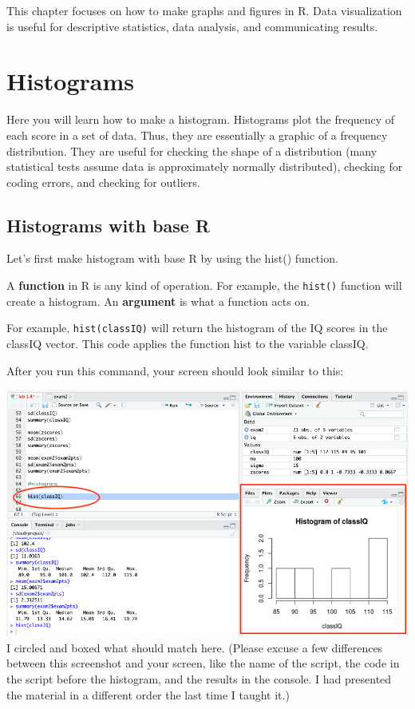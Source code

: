 \documentclass[
]{book}
\begin{document}
This chapter focuses on how to make graphs and figures in R. Data visualization is useful for descriptive statistics, data analysis, and communicating results.

\hypertarget{histograms}{%
\section{Histograms}\label{histograms}}

Here you will learn how to make a histogram. Histograms plot the frequency of each score in a set of data. Thus, they are essentially a graphic of a frequency distribution. They are useful for checking the shape of a distribution (many statistical tests assume data is approximately normally distributed), checking for coding errors, and checking for outliers.

\hypertarget{histograms-with-base-r}{%
\subsection{Histograms with base R}\label{histograms-with-base-r}}

Let's first make histogram with base R by using the hist() function.

A \textbf{function} in R is any kind of operation. For example, the \texttt{hist()} function will create a histogram. An \textbf{argument} is what a function acts on.

For example, \texttt{hist(classIQ)} will return the histogram of the IQ scores in the classIQ vector. This code applies the function hist to the variable classIQ.

After you run this command, your screen should look similar to this:

\includegraphics{img/basehist.png}
I circled and boxed what should match here. (Please excuse a few differences between this screenshot and your screen, like the name of the script, the code in the script before the histogram, and the results in the console. I had presented the material in a different order the last time I taught it.)
\end{document}
